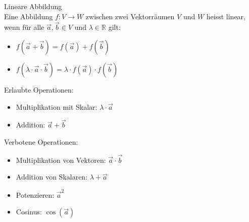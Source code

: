 \begin{definition}{Lineare Abbildung}\\
    Eine Abbildung $f: V \rightarrow W$ zwischen zwei Vektorräumen $V$ und $W$ heisst linear, wenn für alle $\overrightarrow{a}, \overrightarrow{b} \in V$ und $\lambda \in \mathbb{R}$ gilt:
    \begin{itemize}
        \item $f(\overrightarrow{a} + \overrightarrow{b}) = f(\overrightarrow{a}) + f(\overrightarrow{b})$
        \item $f(\lambda \cdot \overrightarrow{a} \cdot \vec{b}) = \lambda \cdot f(\overrightarrow{a}) \cdot f(\vec{b})$
    \end{itemize}
    \vspace{2mm}
    Erlaubte Operationen:\\
    \begin{minipage}{0.6\linewidth}
        \begin{itemize}
            \item Multiplikation mit Skalar: $\lambda \cdot \vec{a}$
        \end{itemize}
    \end{minipage}
    \begin{minipage}{0.3\linewidth}
        \begin{itemize}
            \item Addition: $\vec{a} + \vec{b}$
        \end{itemize}
    \end{minipage}
    
    Verbotene Operationen:\\
    \begin{minipage}{0.6\linewidth}
        \begin{itemize}
            \item Multiplikation von Vektoren: $\vec{a} \cdot \vec{b}$
            \item Addition von Skalaren: $\lambda + \vec{a}$
        \end{itemize}
    \end{minipage}
    \begin{minipage}{0.3\linewidth}
        \begin{itemize}
            \item Potenzieren: $\vec{a}^2$
            \item Cosinus: $\cos(\vec{a})$
        \end{itemize}
    \end{minipage}
\end{definition}

